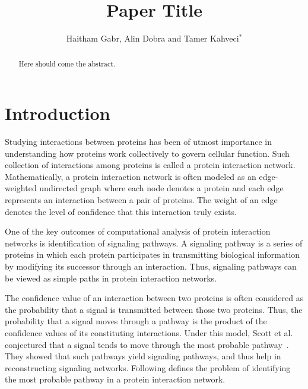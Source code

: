 \documentclass{ws-procs11x85}
\begin{document}
\title{Paper Title}

\author{Haitham Gabr, Alin Dobra and Tamer Kahveci$^*$}

\address{CISE Department, University of Florida,\\
Gainesville, FL 32611, USA\\
E-mail: \{hgabr, adobra, tamer$^*$\}@cise.ufl.edu}

\begin{abstract}
Here should come the abstract.
\end{abstract}


\bodymatter

\section{Introduction} 
\label{introduction}

Studying interactions between proteins has been of utmost importance in
understanding how proteins work collectively to govern cellular
function\cite{schwikowski,uetz}. Such collection of interactions among
proteins is called a protein interaction network. Mathematically, a protein
interaction network is often modeled as an edge-weighted undirected graph where
each node denotes a protein and each edge represents an interaction between a
pair of proteins. The weight of an edge denotes the level of confidence that
this interaction truly exists.

One of the key outcomes of computational analysis of protein interaction
networks is identification of signaling pathways. A signaling pathway is a
series of proteins in which each protein participates in transmitting
biological information by modifying its successor through an
interaction. Thus, signaling pathways can be viewed as simple paths in protein
interaction networks\cite{kelley}.

The confidence value of an interaction between two proteins is often
considered as the probability that a signal is transmitted between
those two proteins.  Thus, the probability that a signal moves through
a pathway is the product of the confidence values of its constituting
interactions. Under this model, Scott et al. conjectured that a signal
tends to move through the most probable pathway~\cite{scott}. They
showed that such pathways yield signaling pathways, and thus help in
reconstructing signaling networks. Following defines the problem of
identifying the most probable pathway in a protein interaction
network.
\end{document}
